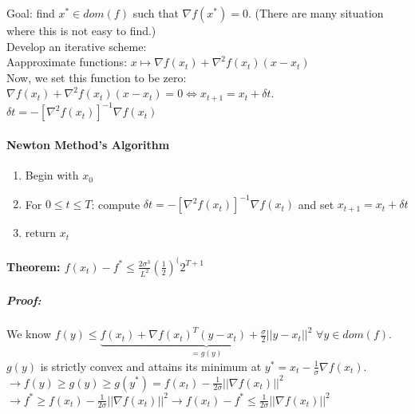 \documentclass[main]{subfiles}
\begin{document}
Goal: find $x^* \in dom(f)$ such that $\nabla f(x^*) = 0$.
(There are many situation where this is not easy to find.)\\
Develop an iterative scheme:\\

Aapproximate functions: $x \mapsto \nabla f(x_t) + \nabla^2 f(x_t)(x-x_t)$\\
Now, we set this function to be zero:\\
$\nabla f(x_t) + \nabla^2 f(x_t)(x-x_t) = 0 \iff x_{t+1} = x_t + \delta t$.\\
$\delta t = -[\nabla^2 f(x_t)]^{-1} \nabla f(x_t)$\\

\paragraph{Newton Method's Algorithm}

\begin{enumerate}
\item Begin with $x_0$
\item For $0 \leq t \leq T$:
\subitem compute $\delta t = -[\nabla^2 f(x_t)]^{-1} \nabla f(x_t)$ and set
$x_{t+1} = x_t + \delta t$
\item return $x_t$
\end{enumerate}


\paragraph{Theorem: $f(x_t) - f^* \leq \frac{2 \sigma^3}{L^2}
(\frac{1}{2})^(2^{T+1}$}

\subparagraph{Proof:}
We know $f(y) \leq \underbrace{f(x_t) + \nabla f(x_t)^T(y-x_t) +
\frac{\sigma}{2} ||y - x_t||^2}_{= g(y)}$ $\forall y \in dom(f)$.\\
$g(y)$ is strictly convex and attains its minimum at
$y^* = x_t - \frac{1}{\sigma} \nabla f(x_t)$.\\
$\rightarrow f(y) \geq g(y) \geq g(y^*) = f(x_t) - \frac{1}{2 \sigma}
||\nabla f(x_t)||^2$\\
$\rightarrow f^* \geq f(x_t) - \frac{1}{2 \sigma}||\nabla f(x_t)||^2
\rightarrow f(x_t) - f^* \leq \frac{1}{2 \sigma}||\nabla f(x_t)||^2$
\end{document}
